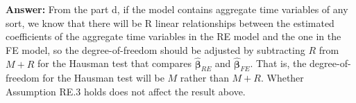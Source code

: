 \begin{enumerate}
\begin{enumerate}
        \textbf{Answer:} From the part d, if the model contains aggregate time variables of any sort, we know that there will be R linear relationships between the estimated coefficients of the aggregate time variables in the RE model and the one in the FE model, so the degree-of-freedom should be adjusted by subtracting $R$ from $M+R$ for the Hausman test that compares $\hat{\bm{\beta}}_{RE}$ and $\hat{\bm{\beta}}_{FE}$. That is, the degree-of-freedom for the Hausman test will be $M$ rather than $M+R$. Whether Assumption RE.3 holds does not affect the result above.
    \end{enumerate}
\end{enumerate}